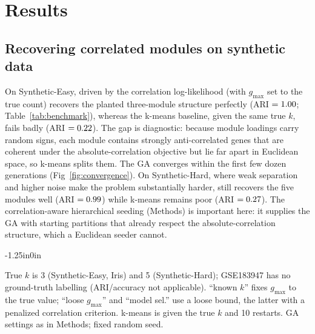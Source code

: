 \section*{Results}

\subsection*{Recovering correlated modules on synthetic data}
On Synthetic-Easy, \tool{} driven by the correlation log-likelihood (with
$g_{\max}$ set to the true count) recovers the planted three-module structure
perfectly (ARI $=1.00{}$; Table~\ref{tab:benchmark}), whereas the k-means baseline, given the
same true $k$, fails badly (ARI $=0.22{}$). The gap is diagnostic:
because module loadings carry random signs, each module contains strongly
anti-correlated genes that are coherent under the absolute-correlation objective
but lie far apart in Euclidean space, so k-means splits them. The GA converges
within the first few dozen generations (Fig~\ref{fig:convergence}). On
Synthetic-Hard, where weak separation and higher noise make the problem
substantially harder, \tool{} still recovers the five modules well
(ARI $=0.99{}$) while k-means remains poor (ARI $=0.27{}$).
The correlation-aware hierarchical seeding (Methods) is important here: it
supplies the GA with starting partitions that already respect the
absolute-correlation structure, which a Euclidean seeder cannot.

\begin{table}[!ht]
\centering
\caption{\textbf{Benchmark results: clusters recovered ($k$), adjusted Rand
index (ARI), and Hungarian-matched accuracy against ground truth.}}
\label{tab:benchmark}
\begin{adjustwidth}{-1.25in}{0in}
\centering
{}
\end{adjustwidth}
\begin{flushleft}
True $k$ is 3 (Synthetic-Easy, Iris) and 5 (Synthetic-Hard); GSE183947 has no
ground-truth labelling (ARI/accuracy not applicable). ``known $k$'' fixes
$g_{\max}$ to the true value; ``loose $g_{\max}$'' and ``model sel.'' use a loose
bound, the latter with a penalized correlation criterion. k-means is given the
true $k$ and 10 restarts. GA settings as in Methods; fixed random seed.
\end{flushleft}
\end{table}

